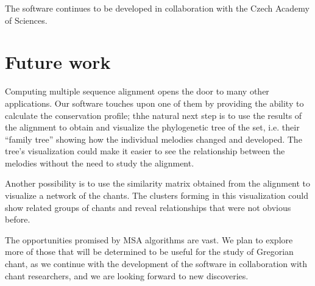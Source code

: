 The software continues to be developed in collaboration with the Czech Aca\-demy of Sciences.

\section*{Future work}

Computing multiple sequence alignment opens the door to many other applications. Our software touches upon one
of them by providing the ability to calculate the conservation profile; thhe natural next step is to use the results of the alignment to
obtain and visualize the phylogenetic tree of the set, i.e. their
``family tree'' showing how the individual melodies changed and developed. The tree's visualization could make it easier to see
the relationship between the melodies without the need to study the alignment.

Another possibility is to use the similarity matrix obtained from the alignment to visualize a network of the chants. The clusters
forming in this visualization could show related groups of chants and reveal relationships that were not obvious before.

The opportunities promised by MSA algorithms are vast. We plan to explore more of those that will be determined to be useful for the study of Gregorian
chant, as we continue with the development of the software in collaboration with chant researchers, and we are looking forward to new discoveries.
